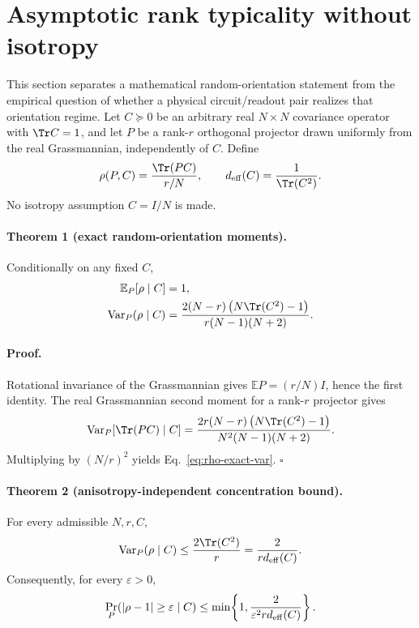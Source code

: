 \section{Asymptotic rank typicality without isotropy}
\label{sec:asymptotic-rank-typicality}

This section separates a mathematical random-orientation statement from the empirical question of whether a physical circuit/readout pair realizes that orientation regime.  Let $C\succeq0$ be an arbitrary real $N\times N$ covariance operator with $\Tr C=1$, and let $P$ be a rank-$r$ orthogonal projector drawn uniformly from the real Grassmannian, independently of $C$.  Define
\begin{equation}
 \rho(P,C)=\frac{\Tr(PC)}{r/N},
 \qquad
 d_{\rm eff}(C)=\frac{1}{\Tr(C^2)}.
\end{equation}
No isotropy assumption $C=I/N$ is made.

\paragraph{Theorem 1 (exact random-orientation moments).}
Conditionally on any fixed $C$,
\begin{align}
 \mathbb E_P[\rho\mid C]&=1,\\
 \operatorname{Var}_P(\rho\mid C)
 &=\frac{2(N-r)\left(N\Tr(C^2)-1\right)}
 {r(N-1)(N+2)}.
 \label{eq:rho-exact-var}
\end{align}

\paragraph{Proof.}
Rotational invariance of the Grassmannian gives $\mathbb E P=(r/N)I$, hence the first identity.  The real Grassmannian second moment for a rank-$r$ projector gives
\begin{equation}
 \operatorname{Var}_P[\Tr(PC)\mid C]
 =\frac{2r(N-r)\left(N\Tr(C^2)-1\right)}
 {N^2(N-1)(N+2)}.
\end{equation}
Multiplying by $(N/r)^2$ yields Eq.~\eqref{eq:rho-exact-var}. \hfill$\square$

\paragraph{Theorem 2 (anisotropy-independent concentration bound).}
For every admissible $N,r,C$,
\begin{equation}
 \operatorname{Var}_P(\rho\mid C)
 \le \frac{2\Tr(C^2)}{r}
 =\frac{2}{r d_{\rm eff}(C)}.
 \label{eq:rho-deff-bound}
\end{equation}
Consequently, for every $\varepsilon>0$,
\begin{equation}
 \Pr_P\!\left(|\rho-1|\ge\varepsilon\mid C\right)
 \le \min\!\left\{1,
 \frac{2}{\varepsilon^2 r d_{\rm eff}(C)}\right\}.
 \label{eq:rho-chebyshev}
\end{equation}

